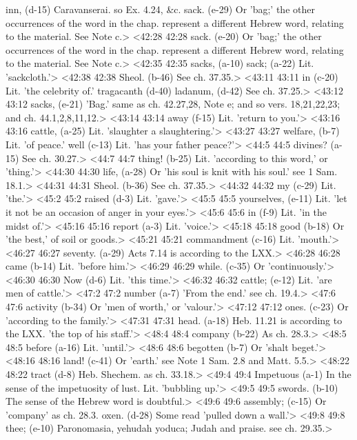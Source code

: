   inn, (d-15)  Caravanserai. so Ex. 4.24, &c.
  sack. (e-29) Or 'bag;' the other occurrences of the word in the chap. represent a different Hebrew word, relating to the material. See Note c.>
<42:28 42:28  sack. (e-20)  Or 'bag;' the other occurrences of the word in the chap.  represent a different Hebrew word, relating to the material.  See Note c.>
<42:35 42:35  sacks, (a-10)  sack; (a-22)
  Lit. 'sackcloth.'>
<42:38 42:38  Sheol. (b-46)  See ch. 37.35.>
<43:11 43:11  in (c-20)  Lit. 'the celebrity of.'
  tragacanth (d-40)  ladanum, (d-42)
  See ch. 37.25.>
<43:12 43:12  sacks, (e-21)  'Bag.' same as ch. 42.27,28, Note e; and so vers.  18,21,22,23; and ch. 44.1,2,8,11,12.>
<43:14 43:14  away (f-15)  Lit. 'return to you.'>
<43:16 43:16  cattle, (a-25)  Lit. 'slaughter a slaughtering.'>
<43:27 43:27  welfare, (b-7)  Lit. 'of peace.'
  well (c-13)  Lit. 'has your father peace?'>
<44:5 44:5  divines? (a-15)  See ch. 30.27.>
<44:7 44:7  thing! (b-25)  Lit. 'according to this word,' or 'thing.'>
<44:30 44:30  life, (a-28)  Or 'his soul is knit with his soul.' see 1 Sam. 18.1.>
<44:31 44:31  Sheol. (b-36)  See ch. 37.35.>
<44:32 44:32  my (c-29)  Lit. 'the.'>
<45:2 45:2  raised (d-3)  Lit. 'gave.'>
<45:5 45:5  yourselves, (e-11)  Lit. 'let it not be an occasion of anger in your eyes.'>
<45:6 45:6  in (f-9)  Lit. 'in the midst of.'>
<45:16 45:16  report (a-3)  Lit. 'voice.'>
<45:18 45:18  good (b-18)  Or 'the best,' of soil or goods.>
<45:21 45:21  commandment (c-16)  Lit. 'mouth.'>
<46:27 46:27  seventy. (a-29)  Acts 7.14 is according to the LXX.>
<46:28 46:28  came (b-14)  Lit. 'before him.'>
<46:29 46:29  while. (c-35)  Or 'continuously.'>
<46:30 46:30  Now (d-6)  Lit. 'this time.'>
<46:32 46:32  cattle; (e-12)  Lit. 'are men of cattle.'>
<47:2 47:2  number (a-7)  'From the end.' see ch. 19.4.>
<47:6 47:6  activity (b-34)  Or 'men of worth,' or 'valour.'>
<47:12 47:12  ones. (c-23)  Or 'according to the family.'>
<47:31 47:31  head. (a-18)  Heb. 11.21 is according to the LXX. 'the top of his staff.'>
<48:4 48:4  company (b-22)  As ch. 28.3.>
<48:5 48:5  before (a-16)  Lit. 'until.'>
<48:6 48:6  begotten (b-7)  Or 'shalt beget.'>
<48:16 48:16  land! (c-41)  Or 'earth.' see Note 1 Sam. 2.8 and Matt. 5.5.>
<48:22 48:22  tract (d-8)  Heb. Shechem. as ch. 33.18.>
<49:4 49:4  Impetuous (a-1)  In the sense of the impetuosity of lust. Lit. 'bubbling up.'>
<49:5 49:5  swords. (b-10)  The sense of the Hebrew word is doubtful.>
<49:6 49:6  assembly; (c-15)  Or 'company' as ch. 28.3.
  oxen. (d-28)  Some read 'pulled down a wall.'>
<49:8 49:8  thee; (e-10)  Paronomasia, yehudah yoduca; Judah and praise. see ch.  29.35.>
